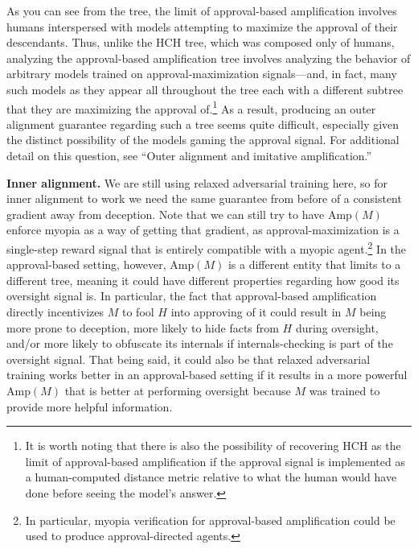 \documentclass[
  onecolumn,
  natbib,
]{miri-tech-article}
\begin{document}
As you can see from the tree, the limit of approval-based amplification involves humans interspersed with models attempting to maximize the approval of their descendants. Thus, unlike the HCH tree, which was composed only of humans, analyzing the approval-based amplification tree involves analyzing the behavior of arbitrary models trained on approval-maximization signals---and, in fact, many such models as they appear all throughout the tree each with a different subtree that they are maximizing the approval of.\footnote{It is worth noting that there is also the possibility of recovering HCH as the limit of approval-based amplification if the approval signal is implemented as a human-computed distance metric relative to what the human would have done before seeing the model's answer.} As a result, producing an outer alignment guarantee regarding such a tree seems quite difficult, especially given the distinct possibility of the models gaming the approval signal. For additional detail on this question, see ``Outer alignment and imitative amplification\cite{TODO: cite https://www.alignmentforum.org/posts/33EKjmAdKFn3pbKPJ/outer-alignment-and-imitative-amplification}.''

\textbf{Inner alignment.} We are still using relaxed adversarial training here, so for inner alignment to work we need the same guarantee from before of a consistent gradient away from deception. Note that we can still try to have $\text{Amp}(M)$ enforce myopia\cite{TODO: cite https://www.alignmentforum.org/posts/BKM8uQS6QdJPZLqCr/towards-a-mechanistic-understanding-of-corrigibility} as a way of getting that gradient, as approval-maximization is a single-step reward signal that is entirely compatible with a myopic agent.\footnote{In particular, myopia verification for approval-based amplification could be used to produce approval-directed agents\cite{TODO: cite https://ai-alignment.com/model-free-decisions-6e6609f5d9}.} In the approval-based setting, however, $\text{Amp}(M)$ is a different entity that limits to a different tree, meaning it could have different properties regarding how good its oversight signal is. In particular, the fact that approval-based amplification directly incentivizes $M$ to fool $H$ into approving of it could result in $M$ being more prone to deception, more likely to hide facts from $H$ during oversight, and/or more likely to obfuscate its internals if internals-checking is part of the oversight signal. That being said, it could also be that relaxed adversarial training works better in an approval-based setting if it results in a more powerful $\text{Amp}(M)$ that is better at performing oversight because $M$ was trained to provide more helpful information.
\end{document}
